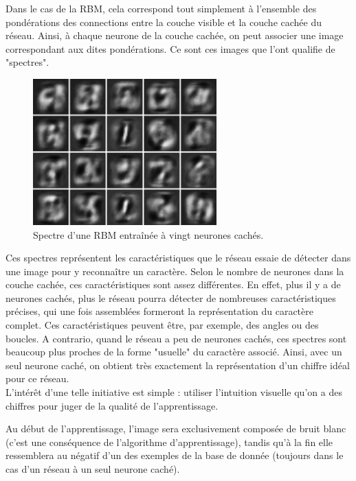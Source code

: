 \documentclass[a4paper,oneside]{report}
\begin{document}
                Dans le cas de la RBM, cela correspond tout simplement à l'ensemble des pondérations des connections entre la couche visible et la couche cachée du réseau. Ainsi, à chaque neurone de la couche cachée, on peut associer une image correspondant aux dites pondérations. Ce sont ces images que l'ont qualifie de "spectres".

                \begin{figure}
                    \begin{center}
                        \includegraphics[width=200pt]{Images/filters-01.png}
                    \end{center}
                    \caption{Spectre d'une RBM entraînée à vingt neurones cachés.}
                \end{figure}

                Ces spectres représentent les caractéristiques que le réseau essaie de détecter dans une image pour y reconnaître un caractère. Selon le nombre de neurones dans la couche cachée, ces caractéristiques sont assez différentes. En effet, plus il y a de neurones cachés, plus le réseau pourra détecter de nombreuses caractéristiques précises, qui une fois assemblées formeront la représentation du caractère complet. Ces caractéristiques peuvent être, par exemple, des angles ou des boucles. A contrario, quand le réseau a peu de neurones cachés, ces spectres sont beaucoup plus proches de la forme "usuelle" du caractère associé. Ainsi, avec un seul neurone caché, on obtient très exactement la représentation d'un chiffre idéal pour ce réseau.\\

                L'intérêt d'une telle initiative est simple : utiliser l'intuition visuelle qu'on a des chiffres pour juger de la qualité de l'apprentissage.

                Au début de l'apprentissage, l'image sera exclusivement composée de bruit blanc (c'est une conséquence de l'algorithme d'apprentissage), tandis qu'à la fin elle ressemblera au négatif d'un des exemples de la base de donnée (toujours dans le cas d'un réseau à un seul neurone caché).
\end{document}
